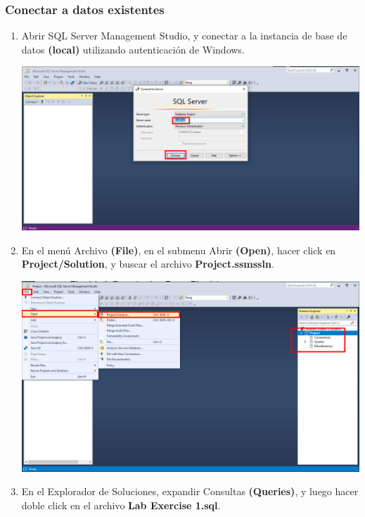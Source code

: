 \documentclass[12pt,letterpaper]{article}
\newcommand\tab[1][1cm]{\hspace*{#1}}
\begin{document}
    \subsubsection{Conectar a datos existentes}
    \begin{enumerate}[\tab 1.]
        \item Abrir SQL Server Management Studio, y conectar a la instancia de base de datos \textbf{(local)} utilizando autenticación de Windows.
        \begin{center}
            \includegraphics[width=13cm]{./img/img1.png}
        \end{center}
        \item En el menú Archivo \textbf{(File)}, en el submenu Abrir \textbf{(Open)}, hacer click en \textbf{Project/Solution}, y buscar el archivo \textbf{Project.ssmssln}.
        \begin{center}
            \includegraphics[width=13cm]{./img/img2.png}
        \end{center}
        \item En el Explorador de Soluciones, expandir Consultas \textbf{(Queries)}, y luego hacer doble click en el archivo \textbf{Lab Exercise 1.sql}.
        \begin{center}

\end{center}
\end{enumerate}
\end{document}
